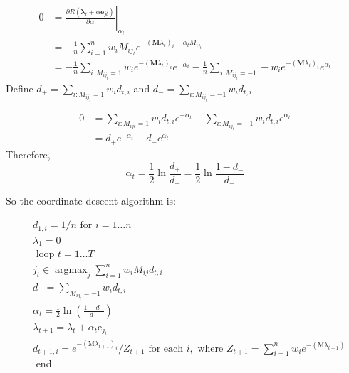 \documentclass{article}
\begin{document}
\begin{equation}\begin{aligned}
0 &=\left.\frac{\partial R\left(\boldsymbol{\lambda}_{t}+\alpha \mathbf{e}_{j t}\right)}{\partial \alpha}\right|_{\alpha_{t}} \\
&=-\frac{1}{n} \sum_{i=1}^{n} w_{i} M_{i j_{t}} e^{-\left(\mathbf{M} \lambda_{t}\right)_{i}-\alpha_{t} M_{i j_{t}}} \\
&=-\frac{1}{n} \sum_{i: M_{i j_{t}}=1} w_{i} e^{-\left(\mathbf{M} \lambda_{t}\right)_{i}} e^{-\alpha_{t}}-\frac{1}{n} \sum_{i: M_{i j_{t}}=-1}- w_{i} e^{-\left(\mathbf{M} \lambda_{t}\right)_{i}} e^{\alpha_{t}}
\end{aligned}\end{equation}
Define $d_{+} = \sum_{i: M_{i j_{t}}=1} w_{i} d_{t, i}$  and $d_{-} = \sum_{i: M_{i j_{t}}=-1} w_{i} d_{t, i}$

\begin{equation}\begin{aligned}
0 &=\sum_{i: M_{i j t}=1}  w_{i} d_{t, i} e^{-\alpha_{t}}-\sum_{i: M_{i j_{t}}=-1}  w_{i} d_{t, i} e^{\alpha_{t}} \\
&={d}_{+} e^{-\alpha_{t}}-d_{-} e^{\alpha_{t}}
\end{aligned}\end{equation}
Therefore,
\begin{equation}\alpha_{t}=\frac{1}{2} \ln \frac{d_{+}}{d_{-}}=\frac{1}{2} \ln \frac{1-d_{-}}{d_{-}}\end{equation}

So the coordinate descent algorithm is:

\begin{equation*}\begin{aligned}
&d_{1, i}=1 / n \text { for } i=1 \ldots n\\
&\lambda_{1}=0\\
&\text { loop } t=1 \ldots T\\
&j_{t} \in \operatorname{argmax}_{j} \sum_{i=1}^{n} w_{i} M_{i j} d_{t, i}\\
&d_{-}=\sum_{M_{i j_{t}}=-1} w_{i} d_{t, i}\\
&\alpha_{t}=\frac{1}{2} \ln \left(\frac{1-d_{-}}{d_{-}}\right)\\
&\lambda_{t+1}=\lambda_{t}+\alpha_{t} \mathrm{e}_{j_{t}}\\
&d_{t+1, i}=e^{-\left(\mathrm{M} \lambda_{t+1}\right)_{i}} / Z_{t+1} \text { for each } i, \text { where } Z_{t+1}=\sum_{i=1}^{n} w_{i} e^{-\left(\mathrm{M} \lambda_{t+1}\right)}\\
&\text { end }
\end{aligned}\end{equation*}
\end{document}
